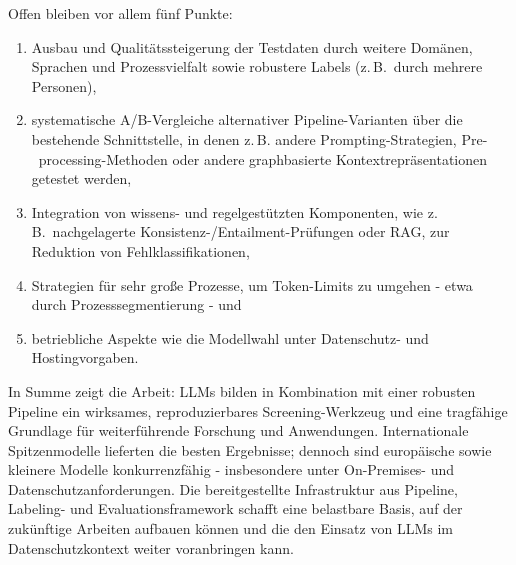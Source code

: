 Offen bleiben vor allem fünf Punkte:
\begin{enumerate}
    \item Ausbau und Qualitätssteigerung der Testdaten durch weitere Domänen, Sprachen und Prozessvielfalt sowie robustere Labels (z.\,B.\ durch mehrere Personen),
    \item systematische A/B-Vergleiche alternativer Pipeline-Varianten über die bestehende Schnittstelle, in denen z.\,B. andere Prompting-Strategien, Pre-\linebreak~processing-Methoden oder andere graphbasierte Kontextrepräsentationen getestet werden,
    \item Integration von wissens- und regelgestützten Komponenten, wie z.\,B.\ nachgelagerte Konsistenz-/Entailment-Prüfungen oder \ac{RAG}, zur Reduktion von Fehlklassifikationen,
    \item Strategien für sehr große Prozesse, um Token-Limits zu umgehen - etwa durch Prozesssegmentierung - und
    \item betriebliche Aspekte wie die Modellwahl unter Datenschutz- und Hostingvorgaben.
\end{enumerate}

In Summe zeigt die Arbeit: \acp{LLM} bilden in Kombination mit einer robusten Pipeline ein wirksames, reproduzierbares Screening-Werkzeug und eine tragfähige Grundlage für weiterführende Forschung und Anwendungen. Internationale Spitzenmodelle lieferten die besten Ergebnisse; dennoch sind europäische sowie kleinere Modelle konkurrenzfähig - insbesondere unter On-Premises- und Datenschutzanforderungen. Die bereitgestellte Infrastruktur aus Pipeline, Labeling- und Evaluationsframework schafft eine belastbare Basis, auf der zukünftige Arbeiten aufbauen können und die den Einsatz von \acp{LLM} im Datenschutzkontext weiter voranbringen kann.
